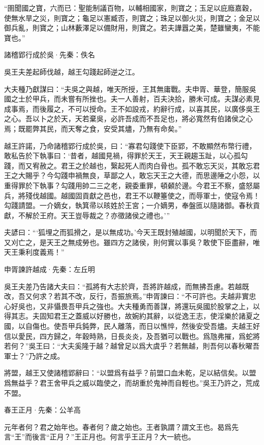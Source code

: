 \documentclass[12pt,a4paper]{ctexbook}
\begin{document}
“圉聞國之寶，六而已：聖能制議百物，以輔相國家，則寶之；玉足以庇廕嘉穀，使無水旱之災，則寶之；龜足以憲臧否，則寶之；珠足以御火災，則寶之；金足以御兵亂，則寶之；山林藪澤足以備財用，則寶之。若夫譁囂之美，楚雖蠻夷，不能寶也。”\par
諸稽郢行成於吳·先秦：佚名 \par
吳王夫差起師伐越，越王勾踐起師逆之江。\par
大夫種乃獻謀曰：“夫吳之與越，唯天所授，王其無庸戰。夫申胥、華登，簡服吳國之士於甲兵，而未嘗有所挫也。夫一人善射，百夫決拾，勝未可成。夫謀必素見成事焉，而後履之，不可以授命。王不如設戎，約辭行成，以喜其民，以廣侈吳王之心。吾以卜之於天，天若棄吳，必許吾成而不吾足也，將必寬然有伯諸侯之心焉；既罷弊其民，而天奪之食，安受其燼，乃無有命矣。”\par
越王許諾，乃命諸稽郢行成於吳，曰：“寡君勾踐使下臣郢，不敢顯然布幣行禮，敢私告於下執事曰：‘昔者，越國見禍，得罪於天王，天王親趨玉趾，以心孤勾踐，而又宥赦之。君王之於越也，繄起死人而肉白骨也。孤不敢忘天災，其敢忘君王之大賜乎？今勾踐申禍無良，草鄙之人，敢忘天王之大德，而思邊陲之小怨，以重得罪於下執事？勾踐用帥二三之老，親委重罪，頓顙於邊。今君王不察，盛怒屬兵，將殘伐越國。越國固貢獻之邑也，君王不以鞭箠使之，而辱軍士，使寇令焉！勾踐請盟。一介嫡女，執箕帚以晐姓於王宮；一介嫡男，奉盤匜以隨諸御。春秋貢獻，不解於王府。天王豈辱裁之？亦徵諸侯之禮也。’”\par
夫諺曰：“‘狐埋之而狐搰之，是以無成功。’今天王既封殖越國，以明聞於天下，而又刈亡之，是天王之無成勞也。雖四方之諸侯，則何實以事吳？敢使下臣盡辭，唯天王秉利度義焉！”\par
申胥諫許越成·先秦：左丘明 \par
吳王夫差乃告諸大夫曰：“孤將有大志於齊，吾將許越成，而無拂吾慮。若越既改，吾又何求？若其不改，反行，吾振旅焉。”申胥諫曰：“不可許也。夫越非實忠心好吳也，又非懾畏吾甲兵之強也。大夫種勇而善謀，將還玩吳國於股掌之上，以得其志。夫固知君王之蓋威以好勝也，故婉約其辭，以從逸王志，使淫樂於諸夏之國，以自傷也。使吾甲兵鈍弊，民人離落，而日以憔悴，然後安受吾燼。夫越王好信以愛民，四方歸之，年穀時熟，日長炎炎，及吾猶可以戰也。爲虺弗摧，爲蛇將若何？”吳王曰：“大夫奚隆于越？越曾足以爲大虞乎？若無越，則吾何以春秋曜吾軍士？”乃許之成。\par
將盟，越王又使諸稽郢辭曰：“以盟爲有益乎？前盟口血未乾，足以結信矣。以盟爲無益乎？君王舍甲兵之威以臨使之，而胡重於鬼神而自輕也。”吳王乃許之，荒成不盟。\par
春王正月·先秦：公羊高 \par
元年者何？君之始年也。春者何？歲之始也。王者孰謂？謂文王也。曷爲先言“王”而後言“正月？”王正月也。何言乎王正月？大一統也。\par
\end{document}
